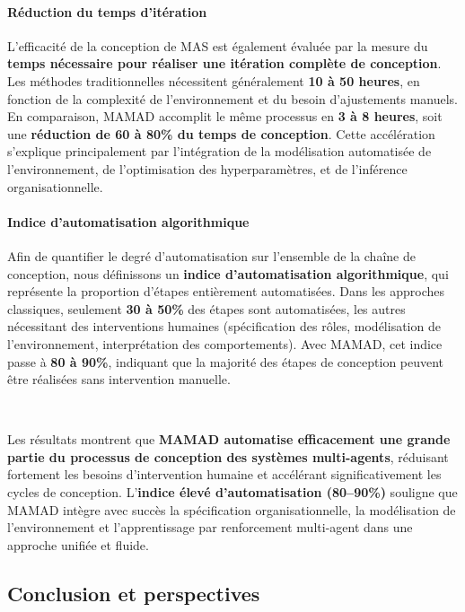 \paragraph{Réduction du temps d'itération}

L'efficacité de la conception de MAS est également évaluée par la mesure du \textbf{temps nécessaire pour réaliser une itération complète de conception}. Les méthodes traditionnelles nécessitent généralement \textbf{10 à 50 heures}, en fonction de la complexité de l'environnement et du besoin d'ajustements manuels. En comparaison, MAMAD accomplit le même processus en \textbf{3 à 8 heures}, soit une \textbf{réduction de 60 à 80\% du temps de conception}. Cette accélération s'explique principalement par l'intégration de la modélisation automatisée de l'environnement, de l'optimisation des hyperparamètres, et de l'inférence organisationnelle.

\paragraph{Indice d'automatisation algorithmique}

Afin de quantifier le degré d'automatisation sur l'ensemble de la chaîne de conception, nous définissons un \textbf{indice d'automatisation algorithmique}, qui représente la proportion d'étapes entièrement automatisées. Dans les approches classiques, seulement \textbf{30 à 50\%} des étapes sont automatisées, les autres nécessitant des interventions humaines (spécification des rôles, modélisation de l'environnement, interprétation des comportements). Avec MAMAD, cet indice passe à \textbf{80 à 90\%}, indiquant que la majorité des étapes de conception peuvent être réalisées sans intervention manuelle.

\

Les résultats montrent que \textbf{MAMAD automatise efficacement une grande partie du processus de conception des systèmes multi-agents}, réduisant fortement les besoins d'intervention humaine et accélérant significativement les cycles de conception. L'\textbf{indice élevé d'automatisation (80--90\%)} souligne que MAMAD intègre avec succès la spécification organisationnelle, la modélisation de l'environnement et l'apprentissage par renforcement multi-agent dans une approche unifiée et fluide.


\subsection{Conclusion et perspectives} \label{sec:conclusion}

